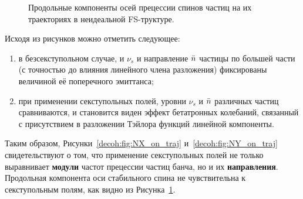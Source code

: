 \begin{figure}[H]
	\centering
	\hfill
	\hfill
	\caption{Продольные компоненты осей прецессии спинов частиц на их траекториях в неидеальной FS-труктуре.\label{decoh:fig:NZ_on_traj}}
\end{figure}

Исходя из рисунков можно отметить следующее:
\begin{enumerate}
	\item в безсекступольном случае, и $\nu_s$ и направление $\bar n$ частицы по большей части (с точностью до влияния линейного члена разложения) фиксированы величиной её поперечного эмиттанса;
	\item при применении секступольных полей, уровни $\nu_s$ и $\bar n$ различных частиц сравниваются, 
	и становится виден эффект бетатронных колебаний, связанный с присутствием 
	в разложении Тэйлора функций линейной компоненты.
\end{enumerate}
Таким образом, Рисунки~\ref{decoh:fig:NX_on_traj} и~\ref{decoh:fig:NY_on_traj} свидетельствуют о том, 
что применение секступольных полей не только выравнивает \textbf{модули} частот прецессии частиц банча, 
но и их \textbf{направления}. Продольная компонента оси стабильного спина не чувствительна 
к секступольным полям, как видно из Рисунка~\ref{decoh:fig:NZ_on_traj}.

